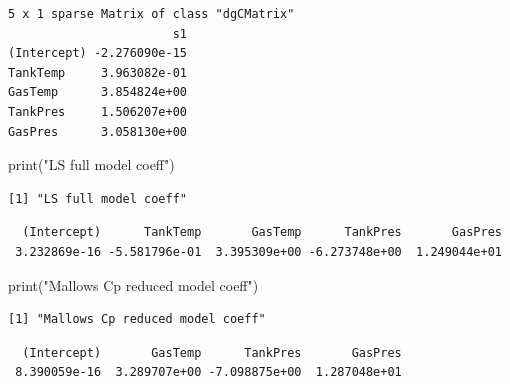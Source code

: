 \documentclass[
  letterpaper,
  DIV=11,
  numbers=noendperiod]{scrartcl}
\newenvironment{Shaded}{\begin{snugshade}}{\end{snugshade}}
\newcommand{\FunctionTok}[1]{\textcolor[rgb]{0.28,0.35,0.67}{#1}}
\newcommand{\NormalTok}[1]{\textcolor[rgb]{0.00,0.23,0.31}{#1}}
\newcommand{\SpecialCharTok}[1]{\textcolor[rgb]{0.37,0.37,0.37}{#1}}
\newcommand{\StringTok}[1]{\textcolor[rgb]{0.13,0.47,0.30}{#1}}
\begin{document}
\begin{verbatim}
5 x 1 sparse Matrix of class "dgCMatrix"
                       s1
(Intercept) -2.276090e-15
TankTemp     3.963082e-01
GasTemp      3.854824e+00
TankPres     1.506207e+00
GasPres      3.058130e+00
\end{verbatim}

\begin{Shaded}
\begin{Highlighting}[]
\FunctionTok{print}\NormalTok{(}\StringTok{"LS full model coeff"}\NormalTok{)}
\end{Highlighting}
\end{Shaded}

\begin{verbatim}
[1] "LS full model coeff"
\end{verbatim}

\begin{Shaded}
\end{Shaded}

\begin{verbatim}
  (Intercept)      TankTemp       GasTemp      TankPres       GasPres 
 3.232869e-16 -5.581796e-01  3.395309e+00 -6.273748e+00  1.249044e+01 
\end{verbatim}

\begin{Shaded}
\begin{Highlighting}[]
\FunctionTok{print}\NormalTok{(}\StringTok{"Mallows Cp reduced model coeff"}\NormalTok{)}
\end{Highlighting}
\end{Shaded}

\begin{verbatim}
[1] "Mallows Cp reduced model coeff"
\end{verbatim}

\begin{Shaded}
\end{Shaded}

\begin{verbatim}
  (Intercept)       GasTemp      TankPres       GasPres 
 8.390059e-16  3.289707e+00 -7.098875e+00  1.287048e+01 
\end{verbatim}
\end{document}
